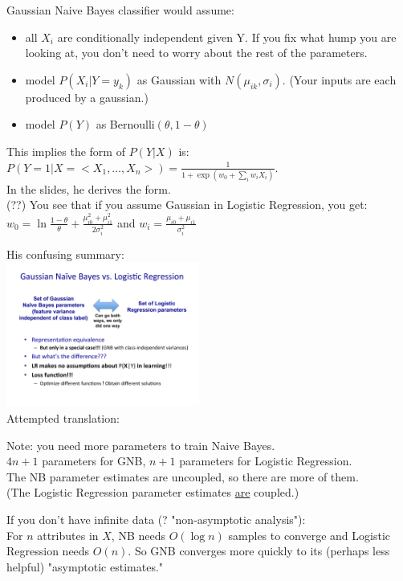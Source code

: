 Gaussian Naive Bayes classifier would assume: \hfill \\
\begin{itemize}
	\item all $X_i$ are conditionally independent given Y.  
		If you fix what hump you are looking at, you don't need to worry about the rest of the parameters. 
	\item model $P(X_i | Y = y_k)$ as Gaussian with $N(\mu_{ik}, \sigma_i)$.  (Your inputs are each produced by a gaussian.)
	\item model $P(Y)$ as Bernoulli$(\theta, 1-\theta)$
\end{itemize} 
This implies the form of $P(Y|X)$ is:
$\displaystyle P(Y=1 | X= < X_1, \dots, X_n >) = \frac{1}{1 + \exp(w_0 + \sum_i w_i X_i)}$. \hfill \\
In the slides, he derives the form.   \hfill \\
(??)  You see that if you assume Gaussian in Logistic Regression, you get: \hfill \\
 $w_0 = \ln \frac{1 - \theta}{\theta} + \frac{\mu_{i0}^2 + \mu_{i1}^2}{2 \sigma_i^2}$ and $w_i = \frac{\mu_{i0} + \mu_{i1}}{\sigma_i^2}$
 
 His confusing summary: \hfill \\
 \includegraphics[width=2.5in]{figures/GNB_vs_LR.pdf} \hfill \\
 Attempted translation: 
 
 Note: you need more parameters to train Naive Bayes. \hfill \\
 $4n + 1$ parameters for GNB,  $n + 1$ parameters for Logistic Regression. \hfill \\
 The NB parameter estimates are uncoupled, so there are more of them.   \hfill \\
 (The Logistic Regression parameter estimates \underline{are} coupled.)

If you don't have infinite data (? "non-asymptotic analysis"): \hfill \\
For $n$ attributes in $X$, NB needs $O(\log n)$ samples to converge and Logistic Regression needs $O(n)$.  
So GNB converges more quickly to its (perhaps less helpful) "asymptotic estimates."

